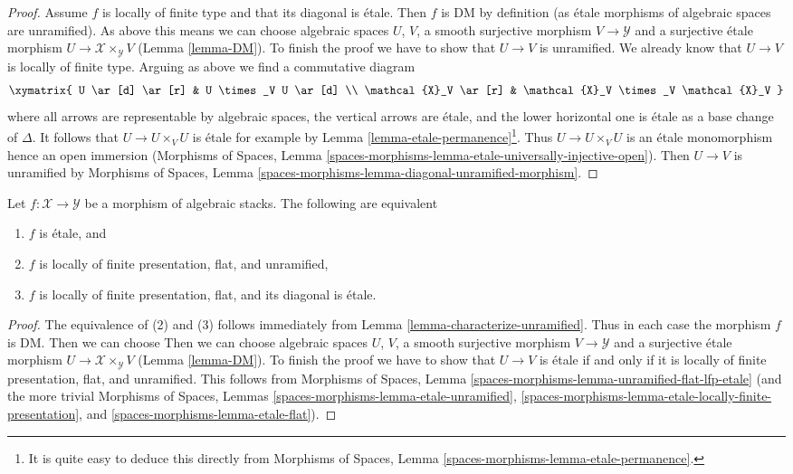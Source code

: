 \begin{proof}
\medskip\noindent
Assume $f$ is locally of finite type and that its diagonal is \'etale.
Then $f$ is DM by definition (as \'etale morphisms of algebraic spaces
are unramified). As above this means we can choose
algebraic spaces $U$, $V$, a smooth surjective morphism
$V \to \mathcal{Y}$ and a surjective \'etale morphism
$U \to \mathcal{X} \times_\mathcal{Y} V$ (Lemma \ref{lemma-DM}).
To finish the proof we have to show that $U \to V$ is unramified.
We already know that $U \to V$ is locally of finite type.
Arguing as above we find a commutative diagram
$$
\xymatrix{
U \ar[d] \ar[r] & U \times_V U \ar[d] \\
\mathcal{X}_V \ar[r] & \mathcal{X}_V \times_V \mathcal{X}_V
}
$$
where all arrows are representable by algebraic spaces,
the vertical arrows are \'etale, and the lower horizontal
one is \'etale as a base change of $\Delta$.
It follows that $U \to U \times_V U$ is \'etale
for example by Lemma \ref{lemma-etale-permanence}\footnote{It is
quite easy to deduce this directly from
Morphisms of Spaces, Lemma \ref{spaces-morphisms-lemma-etale-permanence}.}.
Thus $U \to U \times_V U$ is an \'etale monomorphism
hence an open immersion (Morphisms of Spaces, Lemma
\ref{spaces-morphisms-lemma-etale-universally-injective-open}).
Then $U \to V$ is unramified by
Morphisms of Spaces, Lemma
\ref{spaces-morphisms-lemma-diagonal-unramified-morphism}.
\end{proof}

\begin{lemma}
\label{lemma-characterize-etale}
Let $f : \mathcal{X} \to \mathcal{Y}$ be a morphism of algebraic stacks.
The following are equivalent
\begin{enumerate}
\item $f$ is \'etale, and
\item $f$ is locally of finite presentation, flat, and unramified,
\item $f$ is locally of finite presentation, flat, and its diagonal
is \'etale.
\end{enumerate}
\end{lemma}

\begin{proof}
The equivalence of (2) and (3) follows immediately from
Lemma \ref{lemma-characterize-unramified}. Thus in each case
the morphism $f$ is DM. Then we can choose Then we can choose
algebraic spaces $U$, $V$, a smooth surjective morphism
$V \to \mathcal{Y}$ and a surjective \'etale morphism
$U \to \mathcal{X} \times_\mathcal{Y} V$ (Lemma \ref{lemma-DM}).
To finish the proof we have to show that
$U \to V$ is \'etale if and only if it is locally of finite
presentation, flat, and unramified.
This follows from Morphisms of Spaces, Lemma
\ref{spaces-morphisms-lemma-unramified-flat-lfp-etale}
(and the more trivial
Morphisms of Spaces, Lemmas
\ref{spaces-morphisms-lemma-etale-unramified},
\ref{spaces-morphisms-lemma-etale-locally-finite-presentation}, and
\ref{spaces-morphisms-lemma-etale-flat}).
\end{proof}








